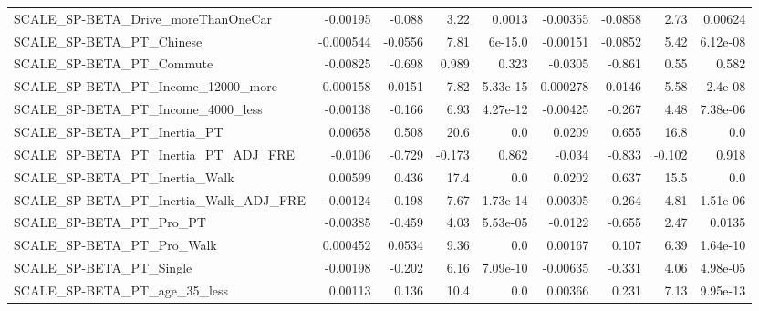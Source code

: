 \begin{tabular}{lrrrrrrrr}
SCALE\_SP-BETA\_Drive\_moreThanOneCar                 &    -0.00195 &       -0.088 &     3.22 &   0.0013 &   -0.00355 &     -0.0858 &         2.73 &       0.00624 \\
SCALE\_SP-BETA\_PT\_Chinese                           &   -0.000544 &      -0.0556 &     7.81 &  6e-15.0 &   -0.00151 &     -0.0852 &         5.42 &      6.12e-08 \\
SCALE\_SP-BETA\_PT\_Commute                           &    -0.00825 &       -0.698 &    0.989 &    0.323 &    -0.0305 &      -0.861 &         0.55 &         0.582 \\
SCALE\_SP-BETA\_PT\_Income\_12000\_more                 &    0.000158 &       0.0151 &     7.82 & 5.33e-15 &   0.000278 &      0.0146 &         5.58 &       2.4e-08 \\
SCALE\_SP-BETA\_PT\_Income\_4000\_less                  &    -0.00138 &       -0.166 &     6.93 & 4.27e-12 &   -0.00425 &      -0.267 &         4.48 &      7.38e-06 \\
SCALE\_SP-BETA\_PT\_Inertia\_PT                        &     0.00658 &        0.508 &     20.6 &      0.0 &     0.0209 &       0.655 &         16.8 &           0.0 \\
SCALE\_SP-BETA\_PT\_Inertia\_PT\_ADJ\_FRE                &     -0.0106 &       -0.729 &   -0.173 &    0.862 &     -0.034 &      -0.833 &       -0.102 &         0.918 \\
SCALE\_SP-BETA\_PT\_Inertia\_Walk                      &     0.00599 &        0.436 &     17.4 &      0.0 &     0.0202 &       0.637 &         15.5 &           0.0 \\
SCALE\_SP-BETA\_PT\_Inertia\_Walk\_ADJ\_FRE              &    -0.00124 &       -0.198 &     7.67 & 1.73e-14 &   -0.00305 &      -0.264 &         4.81 &      1.51e-06 \\
SCALE\_SP-BETA\_PT\_Pro\_PT                            &    -0.00385 &       -0.459 &     4.03 & 5.53e-05 &    -0.0122 &      -0.655 &         2.47 &        0.0135 \\
SCALE\_SP-BETA\_PT\_Pro\_Walk                          &    0.000452 &       0.0534 &     9.36 &      0.0 &    0.00167 &       0.107 &         6.39 &      1.64e-10 \\
SCALE\_SP-BETA\_PT\_Single                            &    -0.00198 &       -0.202 &     6.16 & 7.09e-10 &   -0.00635 &      -0.331 &         4.06 &      4.98e-05 \\
SCALE\_SP-BETA\_PT\_age\_35\_less                       &     0.00113 &        0.136 &     10.4 &      0.0 &    0.00366 &       0.231 &         7.13 &      9.95e-13 \\

\end{tabular}
